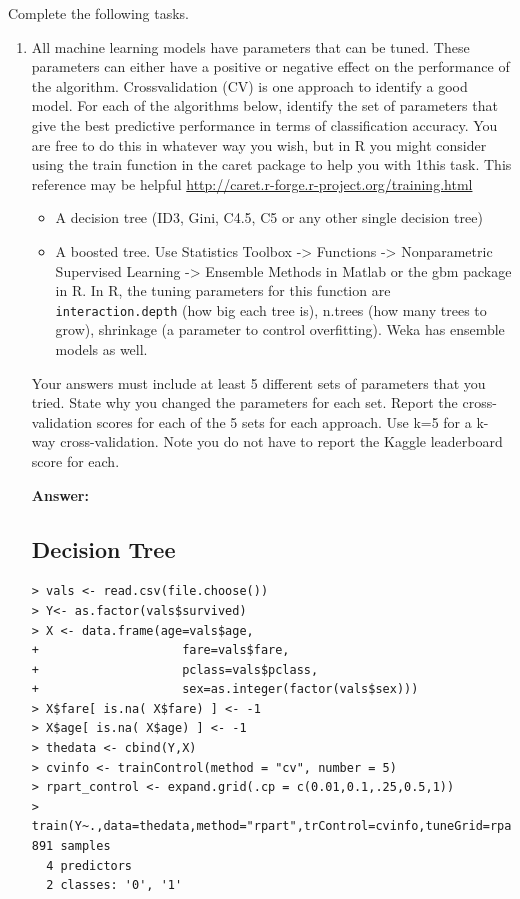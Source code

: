 \documentclass[fontsize=10pt]{scrartcl}
\begin{document}
		Complete the following tasks.

		\begin{enumerate}
			\item
			All machine learning models have parameters that can be tuned. These parameters can either have a positive or negative eﬀect on the performance of the algorithm. Crossvalidation (CV) is one approach to identify a good model. For each of the algorithms below, identify the set of parameters that give the best predictive performance in terms of classiﬁcation accuracy. You are free to do this in whatever way you wish, but in R you might consider using the train function in the caret package to help you with 1this task. This reference may be helpful \url{http://caret.r-forge.r-project.org/training.html}

			\begin{itemize}
				\item
				A decision tree (ID3, Gini, C4.5, C5 or any other single decision tree)

				\item
				A boosted tree. Use Statistics Toolbox -> Functions -> Nonparametric Supervised Learning -> Ensemble Methods in Matlab or the gbm package in R. In R, the tuning parameters for this function are \texttt{interaction.depth} (how big each tree is), n.trees (how many trees to grow), shrinkage (a parameter to control overﬁtting). Weka has ensemble models as well.
			\end{itemize}

			Your answers must include at least 5 different sets of parameters that you tried. State why you changed the parameters for each set. Report the cross-validation scores for each of the 5 sets for each approach. Use k=5 for a k-way cross-validation. Note you do not have to report the Kaggle leaderboard score for each.

			\textbf{Answer:}

			\subsection{Decision Tree}

\begin{verbatim}
> vals <- read.csv(file.choose())
> Y<- as.factor(vals$survived)
> X <- data.frame(age=vals$age,
+                    fare=vals$fare,
+                    pclass=vals$pclass,
+                    sex=as.integer(factor(vals$sex)))
> X$fare[ is.na( X$fare) ] <- -1
> X$age[ is.na( X$age) ] <- -1
> thedata <- cbind(Y,X)
> cvinfo <- trainControl(method = "cv", number = 5)
> rpart_control <- expand.grid(.cp = c(0.01,0.1,.25,0.5,1)) 
> train(Y~.,data=thedata,method="rpart",trControl=cvinfo,tuneGrid=rpart_control)
891 samples
  4 predictors
  2 classes: '0', '1' 


\end{verbatim}
\end{enumerate}
\end{document}
